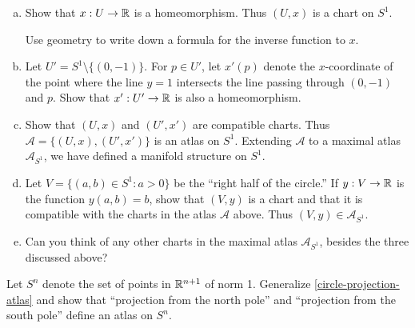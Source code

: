 \begin{exercise}
\begin{enumerate}[(a)]
		\item Show that $x : U \to \mathbb{R}$ is a homeomorphism. Thus $(U, x)$ is a chart on $S^1$. 
		\begin{hint} 
			Use geometry to write down a formula for the inverse function to $x$. 
		\end{hint}
		
		\item Let $U' = S^1 \setminus \{(0,-1)\}$. For $p \in U'$, let $x'(p)$ denote the $x$-coordinate of the point where the line $y = 1$ intersects the line passing through $(0,-1)$ and $p$. Show that $x' : U' \to \mathbb{R}$ is also a homeomorphism. 
		
		\item Show that $(U, x)$ and $(U', x')$ are compatible charts. Thus $\mathscr{A} = \{(U, x), (U', x')\}$ is an atlas on $S^1$. Extending $\mathscr{A}$ to a maximal atlas $\mathscr{A}_{S^1}$, we have defined a manifold structure on $S^1$.
		
		\item Let $V = \{ (a,b) \in S^1 : a > 0 \}$ be the ``right half of the circle.'' If $y : V \to \mathbb{R}$ is the function $y(a,b) = b$, show that $(V,y)$ is a chart and that it is compatible with the charts in the atlas $\mathscr{A}$ above. Thus $(V,y) \in \mathscr{A}_{S^1}$. 
		
		\item Can you think of any other charts in the maximal atlas $\mathscr{A}_{S^1}$, besides the three discussed above? 
	\end{enumerate}
\end{exercise}

\begin{exercise} \label{sphere-projection-atlas}  
	Let $S^n$ denote the set of points in $\mathbb{R}^{n+1}$ of norm 1. Generalize \cref{circle-projection-atlas} and show that ``projection from the north pole'' and ``projection from the south pole'' define an atlas on $S^n$. 
\end{exercise}

